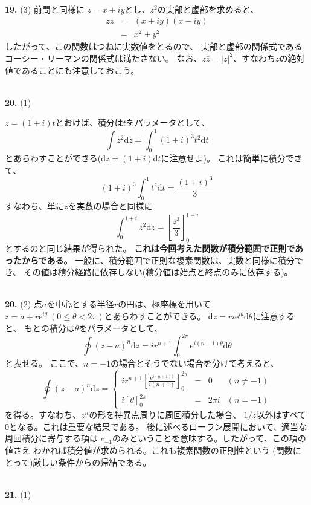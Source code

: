 \documentclass{jarticle}
\newcommand{\diff}{\mathrm d}
\newcommand{\ans}[2]{\noindent\\ {\bf \large #1.} (#2)}
\newcommand{\e}{\mathrm e}
\begin{document}
\ans{19}{3}
前問と同様に
$z = x+ iy$とし、$z^2$の実部と虚部を求めると、
\begin{eqnarray}
  z\bar{z} &=& (x+iy)(x-iy)\\
  &=& x^2 + y^2
\end{eqnarray}
したがって、この関数はつねに実数値をとるので、
実部と虚部の関係式であるコーシー・リーマンの関係式は満たさない。
なお、$z \bar{z} = |z|^2$、すなわち$z$の絶対値であることにも注意しておこう。

\ans{20}{1}

$z = (1+i)t$とおけば、積分は$t$をパラメータとして、
$$
  \int z^2 \diff z = \int_0^1 (1+i)^3 t^2  \diff t
$$
とあらわすことができる($\diff z = (1+i) \diff t$に注意せよ)。
これは簡単に積分できて、
$$
  (1+i)^3 \int_0^1 t^2  \diff t = \frac{(1+i)^3}{3}
$$
すなわち、単に$z$を実数の場合と同様に
$$
  \int_0^{1+i} z^2 \diff z = \left[ \frac{z^3}{3}  \right]_0^{1+i}
$$
とするのと同じ結果が得られた。
{\bf これは今回考えた関数が積分範囲で正則であったからである。}
一般に、積分範囲で正則な複素関数は、実数と同様に積分でき、
その値は積分経路に依存しない(積分値は始点と終点のみに依存する)。

\ans{20}{2}
点$a$を中心とする半径$r$の円は、極座標を用いて
$z = a + r\e^{i\theta} ~(0 \le \theta < 2\pi)$とあらわすことができる。
$\diff z = ri \e^{i\theta} \diff \theta$に注意すると、
もとの積分は$\theta$をパラメータとして、
\begin{equation}
  \oint (z-a)^n \diff z = i r^{n+1} \int_0^{2\pi} \e^{i(n+1)\theta} \diff \theta
\end{equation}
と表せる。
ここで、$n = -1$の場合とそうでない場合を分けて考えると、
\begin{equation}
  \oint (z-a)^n \diff z =
  \left\{
  \begin{array}{cccc}
    i r^{n+1} \left[ \displaystyle\frac{\e^{i(n+1)\theta}}{i(n+1)} \right]_0^{2\pi} & = & 0      & (n \neq -1) \\
    i \left[ \theta  \right]_0^{2\pi}                                               & = & 2\pi i & (n=-1)
  \end{array}
  \right.
\end{equation}
を得る。すなわち、$z^n$の形を特異点周りに周回積分した場合、
$1/z$以外はすべて$0$となる。これは重要な結果である。
後に述べるローラン展開において、適当な周回積分に寄与する項は
$c_{-1}$のみということを意味する。したがって、この項の値さえ
わかれば積分値が求められる。これも複素関数の正則性という
(関数にとって)厳しい条件からの帰結である。

\ans{21}{1}
\end{document}
